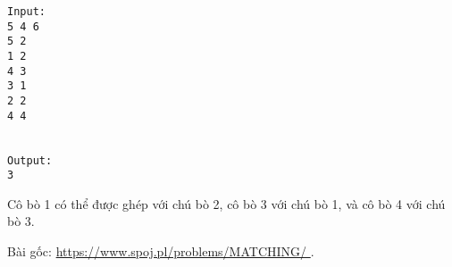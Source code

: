 \begin{verbatim}
Input:
5 4 6
5 2
1 2
4 3
3 1
2 2
4 4


Output:
3

\end{verbatim}

   Cô bò 1 có thể được ghép với chú bò 2, cô bò 3 với chú bò 1, và cô bò 4 với chú bò 3.  

   Bài gốc:   \href{https://www.spoj.pl/problems/MATCHING/}{    https://www.spoj.pl/problems/MATCHING/   }   .